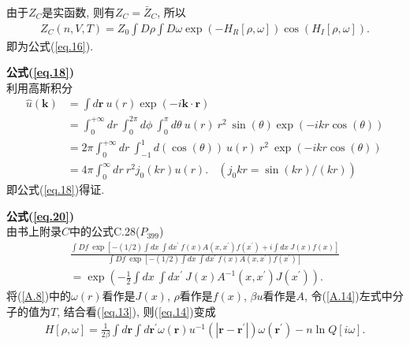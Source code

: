 由于$Z_{C}$是实函数, 则有$Z_{C}=\bar{Z}_{C}$, 所以
   \begin{equation}
       \begin{aligned}
           Z_C(n, V, T)=Z_0\int D\rho \int D\omega
           \exp(-H_{R}[\rho, \omega])\cos(H_{I}[\rho, \omega]).
    \end{aligned}
       \label{A.12}
    \end{equation}
即为公式(\ref{eq.16}).
\par
\textbf{公式(\ref{eq.18})}
\\
利用高斯积分
  \begin{equation}
       \begin{aligned}
           \hat{u}(\bm{k})&=\int d\bm{r}\ u(r)\exp(-i\bm{k\cdot
           r})
           \\
           &=\int^{+\infty}_{0} dr\ \int^{2\pi}_{0} d\phi\ \int^{\pi}_{0}
           d\theta\ u(r)\ r^{2}\ \sin(\theta)\exp(-ikr\cos(\theta))
           \\
           &=2\pi\int^{+\infty}_{0} dr\ \int^{1}_{-1}
           d(\cos(\theta))\ u(r)\ r^{2}\ \exp(-ikr\cos(\theta))
           \\
           &=4\pi\int_0^{\infty} dr\ r^2 j_0(kr)u(r).\ \ \ \
           (j_0{kr}=\sin(kr)/(kr))       
       \end{aligned}
       \label{A.13}
    \end{equation}
即公式(\ref{eq.18})得证.
\par
\textbf{公式(\ref{eq.20})}
\\
由书上附录$C$中的公式C.28($P_{399}$)
   \begin{equation}
       \begin{aligned}
           \frac{ \int Df\ \exp[-(1/2)\int dx\ \int dx^{'}\ f(x)A(x,
           x^{'})f(x^{'})+i\int dx\ J(x)f(x)]}{\int Df\ \exp[-(1/2)\int dx\ \int dx^{'}\ f(x)A(x,
           x^{'})f(x^{'})]}
           \\
           =\exp{\left(-\frac{1}{2}\int dx\ \int dx^{'}\ J(x)A^{-1}(x,
           x^{'})J(x^{'})\right)}.
    \end{aligned}
       \label{A.14}
    \end{equation}
将(\ref{A.8})中的$\omega(r)$看作是$J(x)$, $\rho$看作是$f(x)$, $\beta u$看作是$A$,
令(\ref{A.14})左式中分子的值为$T$, 结合看(\ref{eq.13}), 则(\ref{eq.14})变成
 \begin{equation}
       \begin{aligned}
           H[\rho, \omega]=\frac{1}{2\beta}\int d\bm{r} \int
           d\bm{r^{'}} \omega(\bm{r})u^{-1}(|\bm{r}-\bm{r^{'}}|)\omega(\bm{r^{'}})-n\ln Q[i\omega].
    \end{aligned}
       \label{A.15}
    \end{equation}
